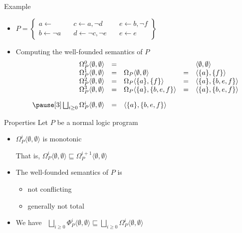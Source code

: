 \begin{frame}{Example}
  \bigskip
  \begin{itemize}
  \item<1->
    \(
    P
    =
    \left\{
      \begin{array}{lll}
        a \leftarrow                \quad &
        c \leftarrow a, \neg d      \quad &
        e \leftarrow b, \neg f
        \\
        b \leftarrow \neg a         \quad &
        d \leftarrow \neg c, \neg e \quad &
        e \leftarrow e
      \end{array}
    \right\}
    \)
  \bigskip
  \item<2-> Computing the well-founded semantics of $P$
    \[
    \begin{array}{rclcl}
      \Omega_P^0\langle\emptyset,\emptyset\rangle&=&                                                & &\langle\emptyset,\emptyset\rangle
      \\
      \Omega_P^1\langle\emptyset,\emptyset\rangle&=&\Omega_P\langle\emptyset,\emptyset\rangle&=&\langle\{a\}    ,\{f\}    \rangle
      \\
      \Omega_P^2\langle\emptyset,\emptyset\rangle&=&\Omega_P\langle\{a\}    ,\{f\}    \rangle&=&\langle\{a\}    ,\{b,e,f\}\rangle
      \\
      \Omega_P^3\langle\emptyset,\emptyset\rangle&=&\Omega_P\langle\{a\}    ,\{b,e,f\}\rangle&=&\langle\{a\}    ,\{b,e,f\}\rangle
      \\[10pt]\pause[3]
      \bigsqcup_{i \geq 0}\Omega_P^i\langle\emptyset,\emptyset\rangle&=&\langle\{a\},\{b,e,f\}\rangle
    \end{array}
    \]
  \end{itemize}
\end{frame}
\begin{frame}{Properties}
  \bigskip
  Let $P$ be a normal logic program
  \medskip
  \begin{itemize}
  \item $\Omega_P^i\langle \emptyset, \emptyset \rangle$ is monotonic
    \smallskip

    That is,
    \(
    \Omega_P^i\langle \emptyset, \emptyset \rangle
    \sqsubseteq
    \Omega_P^{i+1}\langle \emptyset, \emptyset \rangle
    \)
    \medskip
  \item The well-founded semantics of $P$ is
    \begin{itemize}\normalsize
    \item not conflicting
    \item generally not total
    \end{itemize}
    \smallskip
  \item We have \
    \(
    \bigsqcup_{i \geq 0}
    \Phi_P^i \langle \emptyset, \emptyset \rangle
    \sqsubseteq
    \bigsqcup_{i \geq 0} \Omega_P^i \langle
    \emptyset, \emptyset \rangle
    \)
  \end{itemize}
\end{frame}

